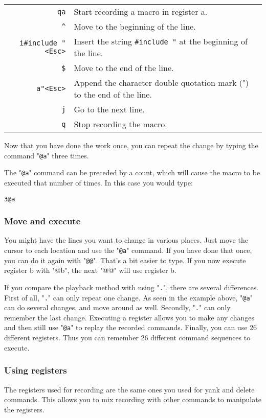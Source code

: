 \begin{center}\begin{longtable}{r l}
				\verb!qa! & Start recording a macro in register a.\\
				\verb!^! & Move to the beginning of the line.\\
				\verb!i#include "<Esc>! & Insert the string \verb!#include "! at the beginning of the line.\\
				\verb!$! & Move to the end of the line.\\
				\verb:a"<Esc>: & Append the character double quotation mark (") to the end of the line.\\
				\verb!j! & Go to the next line.\\
				\verb!q! & Stop recording the macro.\\
\end{longtable}\end{center}

Now that you have done the work once, you can repeat the change by typing the command "\verb!@a!" three times.

The "\verb!@a!" command can be preceded by a count, which will cause the macro to be executed that number of times.
In this case you would type:

\begin{Verbatim}[samepage=true]
 3@a
\end{Verbatim}

\subsubsection{Move and execute}
You might have the lines you want to change in various places.
Just move the cursor to each location and use the "\verb!@a!" command.
If you have done that once, you can do it again with "\verb!@@!".
That's a bit easier to type.
If you now execute register b with "@b", the next "@@" will use register b.

If you compare the playback method with using "\verb!.!", there are several differences.
First of all, "\verb!.!" can only repeat one change.
As seen in the example above, "\verb!@a!" can do several changes, and move around as well.
Secondly, "\verb!.!" can only remember the last change.
Executing a register allows you to make any changes and then still use "\verb!@a!" to replay the recorded commands.
Finally, you can use 26 different registers.
Thus you can remember 26 different command sequences to execute.


\subsubsection{Using registers}
The registers used for recording are the same ones you used for yank and delete commands.
This allows you to mix recording with other commands to manipulate the registers.

